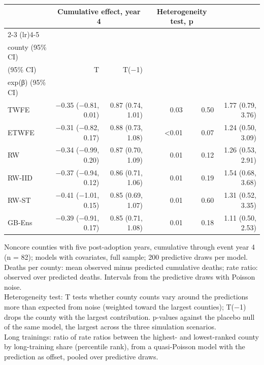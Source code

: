 \begin{table}
\fontsize{9.0pt}{11.0pt}\selectfont\setlength\tabcolsep{3.5pt}
\begin{tabular*}{1\linewidth}{@{\extracolsep{\fill}}lrrrrr}
\toprule
 & \multicolumn{2}{c}{{Cumulative effect, year 4}} & \multicolumn{2}{c}{{Heterogeneity test, p}} &  \\ 
\cmidrule(lr){2-3} \cmidrule(lr){4-5}
 & \begin{tabular}[b]{@{}r@{}}Deaths per\\county (95\% CI)\end{tabular} & \begin{tabular}[b]{@{}r@{}}Rate ratio\\(95\% CI)\end{tabular} & T & T(−1) & \begin{tabular}[b]{@{}r@{}}Long trainings,\\exp(β) (95\% CI)\end{tabular} \\ 
\midrule\addlinespace[2.5pt]
TWFE & −0.35 (−0.81, 0.01) & 0.87 (0.74, 1.01) & 0.03 & 0.50 & 1.77 (0.79, 3.76) \\ 
ETWFE & −0.31 (−0.82, 0.17) & 0.88 (0.73, 1.08) & <0.01 & 0.07 & 1.24 (0.50, 3.09) \\ 
RW & −0.34 (−0.99, 0.20) & 0.87 (0.70, 1.09) & 0.01 & 0.12 & 1.26 (0.53, 2.91) \\ 
RW-IID & −0.37 (−0.94, 0.12) & 0.86 (0.71, 1.06) & 0.01 & 0.19 & 1.54 (0.68, 3.68) \\ 
RW-ST & −0.41 (−1.01, 0.15) & 0.85 (0.69, 1.07) & 0.01 & 0.60 & 1.31 (0.52, 3.35) \\ 
GB-Ens & −0.39 (−0.91, 0.17) & 0.85 (0.71, 1.08) & 0.01 & 0.18 & 1.11 (0.50, 2.53) \\ 
\bottomrule
\end{tabular*}
\begin{minipage}{\linewidth}
\vspace{.05em}
Noncore counties with five post-adoption years, cumulative through event year 4 (n = 82); models with covariates, full sample; 200 predictive draws per model.\\
Deaths per county: mean observed minus predicted cumulative deaths; rate ratio: observed over predicted deaths. Intervals from the predictive draws with Poisson noise.\\
Heterogeneity test: T tests whether county counts vary around the predictions more than expected from noise (weighted toward the largest counties); T(−1) drops the county with the largest contribution. p-values against the placebo null of the same model, the largest across the three simulation scenarios.\\
Long trainings: ratio of rate ratios between the highest- and lowest-ranked county by long-training share (percentile rank), from a quasi-Poisson model with the prediction as offset, pooled over predictive draws.\\
\end{minipage}
\end{table}

